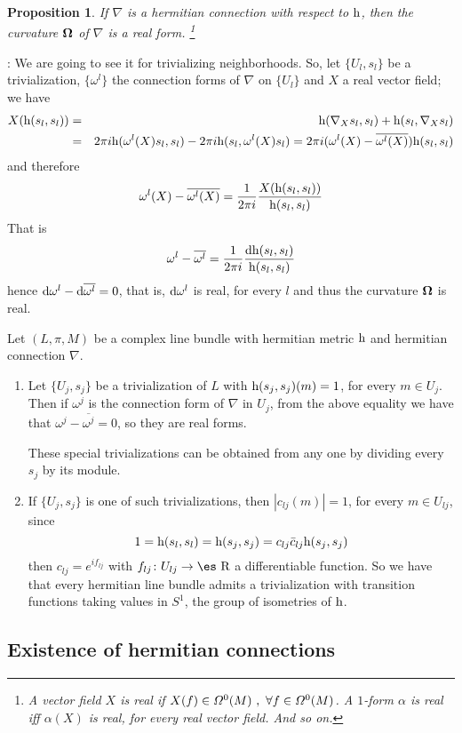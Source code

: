 \documentclass[12pt]{article}
\theoremstyle{plain}
\newtheorem{prop}{Proposition}
\def\beann{\begin{eqnarray*}}
\def\eeann{\end{eqnarray*}}
\def\qed{\ifvmode\removelastskip\fi
{\unskip\nobreak\hfil\penalty50\hbox{}\nobreak\hfil
\hbox{\vrule height1.2ex width1.2ex}\parfillskip=0pt
\finalhyphendemerits=0 \par\smallskip}}
\def\d{{\rm d}}
\def\h{{\rm h}}
\def\curv{{\bf \Omega}}
\def\Real{\mbox{\es R}}
\begin{document}
\begin{prop}
If $\nabla$ is a hermitian connection with respect to $\h$,
then the curvature $\curv $ of $\nabla$ is a real form.%
\footnote{A vector field $X$ is {\it real} if $X(f) \in {\mit\Omega}^0(M) \ ,
\ \forall f \in {\mit\Omega}^0(M)$. A $1$-form $\alpha$ is real iff
$\alpha (X)$ is real, for every real vector field. And so on.
}
\label{cureal}
\end{prop}
:  We are going to see it for trivializing
neighborhoods. So, let $\{ U_l,s_l \}$ be a trivialization, $\{
\omega^l  \}$ the connection forms of $\nabla$ on $\{ U_l \}$ and
$X$ a real vector field; we have \beann X(\h (s_l,s_l)) &=& \h
(\nabla_X s_l,s_l) + \h (s_l,\nabla_X s_l)
\\ &=&
2\pi i \h (\omega^l (X)s_l,s_l) - 2\pi i \h (s_l,\omega^l (X)s_l) =
2\pi i (\omega^l (X) - \overline{\omega^l (X)}) \h (s_l,s_l)
\eeann
and therefore
$$
\omega^l (X) - \overline{\omega^l (X)} =
\frac{1}{2\pi i} \frac{X(\h (s_l,s_l))}{\h (s_l,s_l)}
$$
That is
$$
\omega^l  - \overline{\omega^l } =
\frac{1}{2\pi i} \frac{\d \h (s_l,s_l)}{\h (s_l,s_l)}
$$
hence $\d\omega^l  - \d\overline{\omega^l } =0$,
that is, $\d\omega^l $ is real,
for every $l$ and thus the curvature $\curv$ is real.
\qed
%
\medskip
{}
Let $(L,\pi ,M)$ be a complex line bundle
with hermitian metric $\h$ and hermitian connection $\nabla$.
\begin{enumerate}
\item
Let $\{ U_j,s_j \}$ be a trivialization of $L$ with
$\h (s_j,s_j)(m) = 1$, for every $m \in U_j$.
Then if $\omega^j$ is the connection form of $\nabla$ in $U_j$,
from the above equality we have that
$\omega^j - \overline{\omega^j} = 0$,
so they are real forms.

These special trivializations can be obtained from any one
by dividing every $s_j$ by its module.
\item
If $\{ U_j,s_j \}$ is one of such trivializations,
then $|c_{l j}(m)|=1$, for every $m \in U_{l j}$, since
$$
1 = \h (s_l,s_l) = \h (s_j,s_j) = c_{l j} \bar c_{l j} \h (s_j,s_j)
$$
then $c_{l j} = e^{if_{l j}}$ with $f_{l j} \colon U_{l j} \to \Real$
a differentiable function. So we have that every hermitian line bundle
admits a trivialization with transition functions
taking values in $S^1$, the group of isometries of $\h$.
\end{enumerate}



\subsection{Existence of hermitian connections}
\end{document}
